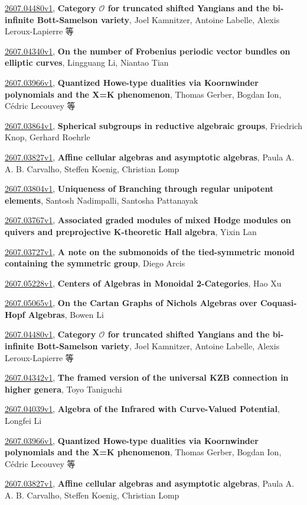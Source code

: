 \documentclass[9pt, a4paper]{article}
\theoremstyle{plain}
\theoremstyle{definition}
\theoremstyle{remark}
\newcommand{\arxiv}[3]{\href{https://arxiv.org/abs/#1}{#1}, \textbf{\textcolor{arxivblue}{#2}}, #3}
\begin{document}
\arxiv{2607.04480v1}{Category $\mathcal{O}$ for truncated shifted Yangians and the bi-infinite Bott-Samelson variety}{Joel Kamnitzer, Antoine Labelle, Alexis Leroux-Lapierre 等}

\arxiv{2607.04340v1}{On the number of Frobenius periodic vector bundles on elliptic curves}{Lingguang Li, Niantao Tian}

\arxiv{2607.03966v1}{Quantized Howe-type dualities via Koornwinder polynomials and the X=K phenomenon}{Thomas Gerber, Bogdan Ion, Cédric Lecouvey 等}

\arxiv{2607.03864v1}{Spherical subgroups in reductive algebraic groups}{Friedrich Knop, Gerhard Roehrle}

\arxiv{2607.03827v1}{Affine cellular algebras and asymptotic algebras}{Paula A. A. B. Carvalho, Steffen Koenig, Christian Lomp}

\arxiv{2607.03804v1}{Uniqueness of Branching through regular unipotent elements}{Santosh Nadimpalli, Santosha Pattanayak}

\arxiv{2607.03767v1}{Associated graded modules of mixed Hodge modules on quivers and preprojective K-theoretic Hall algebra}{Yixin Lan}

\arxiv{2607.03727v1}{A note on the submonoids of the tied-symmetric monoid containing the symmetric group}{Diego Arcis}

\arxiv{2607.05228v1}{Centers of Algebras in Monoidal 2-Categories}{Hao Xu}

\arxiv{2607.05065v1}{On the Cartan Graphs of Nichols Algebras over Coquasi-Hopf Algebras}{Bowen Li}

\arxiv{2607.04480v1}{Category $\mathcal{O}$ for truncated shifted Yangians and the bi-infinite Bott-Samelson variety}{Joel Kamnitzer, Antoine Labelle, Alexis Leroux-Lapierre 等}

\arxiv{2607.04342v1}{The framed version of the universal KZB connection in higher genera}{Toyo Taniguchi}

\arxiv{2607.04039v1}{Algebra of the Infrared with Curve-Valued Potential}{Longfei Li}

\arxiv{2607.03966v1}{Quantized Howe-type dualities via Koornwinder polynomials and the X=K phenomenon}{Thomas Gerber, Bogdan Ion, Cédric Lecouvey 等}

\arxiv{2607.03827v1}{Affine cellular algebras and asymptotic algebras}{Paula A. A. B. Carvalho, Steffen Koenig, Christian Lomp}

\end{document}
